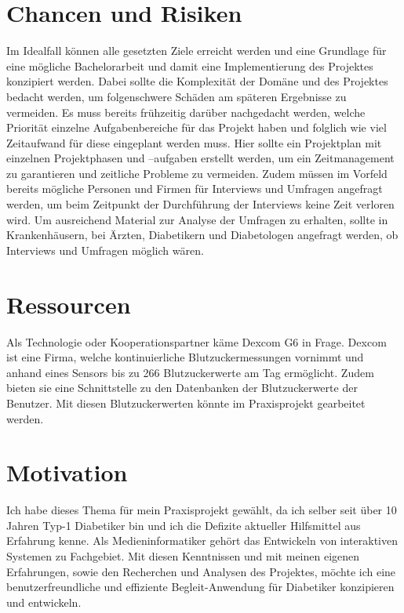 \documentclass[a4paper, 12pt]{scrartcl}
\begin{document}
			\section{Chancen und Risiken}
				Im Idealfall können alle gesetzten Ziele erreicht werden und eine Grundlage für eine mögliche Bachelorarbeit und damit eine Implementierung des Projektes konzipiert werden.				
				Dabei sollte die Komplexität der Domäne und des Projektes bedacht werden, um folgenschwere Schäden am späteren Ergebnisse zu vermeiden. Es muss bereits frühzeitig darüber nachgedacht werden, welche Priorität einzelne Aufgabenbereiche für das Projekt haben und folglich wie viel Zeitaufwand für diese eingeplant werden muss. Hier sollte ein Projektplan mit einzelnen Projektphasen und –aufgaben erstellt werden, um ein Zeitmanagement zu garantieren und zeitliche Probleme zu vermeiden.
				Zudem müssen im Vorfeld bereits mögliche Personen und Firmen für Interviews und Umfragen angefragt werden, um beim Zeitpunkt der Durchführung der Interviews keine Zeit verloren wird. Um ausreichend Material zur Analyse der Umfragen zu erhalten, sollte in Krankenhäusern, bei Ärzten, Diabetikern und Diabetologen angefragt werden, ob Interviews und Umfragen möglich wären.
			
			\section{Ressourcen}
				Als Technologie oder Kooperationspartner käme Dexcom G6 in Frage. Dexcom ist eine Firma, welche kontinuierliche Blutzuckermessungen vornimmt und anhand eines Sensors bis zu 266 Blutzuckerwerte am Tag ermöglicht. Zudem bieten sie eine Schnittstelle zu den Datenbanken der Blutzuckerwerte der Benutzer. Mit diesen Blutzuckerwerten könnte im Praxisprojekt gearbeitet werden.

			
			\section{Motivation}
			Ich habe dieses Thema für mein Praxisprojekt gewählt, da ich selber seit über 10 Jahren Typ-1 Diabetiker bin und ich die Defizite aktueller Hilfsmittel aus Erfahrung kenne. Als Medieninformatiker gehört das Entwickeln von interaktiven Systemen zu Fachgebiet. Mit diesen Kenntnissen und mit meinen eigenen Erfahrungen, sowie den Recherchen und Analysen des Projektes, möchte ich eine benutzerfreundliche und effiziente Begleit-Anwendung für Diabetiker konzipieren und entwickeln. 

		
	
	
\end{document}
